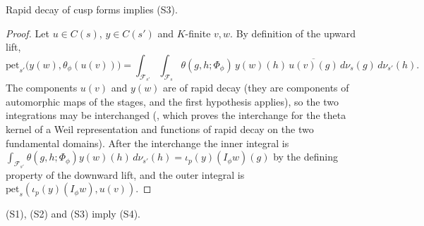 \begin{lemma}\label{pf:bundles:lem:adj}
Rapid decay of cusp forms implies (S3).
\end{lemma}

\begin{proof}
Let $u\in C(s)$, $y\in C(s')$ and $K$-finite $v,w$. By definition of the upward lift,
\[
\mathrm{pet}_{s'}\bigl(y(w),\theta_\phi(u(v))\bigr)=\int_{\mathcal F_{s'}}\int_{\mathcal F_s}\theta(g,h;\Phi_\phi)\,y(w)(h)\,
\overline{u(v)(g)}\,d\nu_s(g)\,d\nu_{s'}(h).
\]
The components $u(v)$ and $y(w)$ are of rapid decay (they are components of automorphic maps of the stages, and the first hypothesis
applies), so the two integrations may be interchanged (, which proves
the interchange for the theta kernel of a Weil representation and functions of rapid decay on the two fundamental domains). After the
interchange the inner integral is $\int_{\mathcal F_{s'}}\theta(g,h;\Phi_\phi)y(w)(h)\,d\nu_{s'}(h)=\iota_p(y)(I_\phi w)(g)$ by the defining
property of the downward lift, and the outer integral is $\mathrm{pet}_s(\iota_p(y)(I_\phi w),u(v))$.
\end{proof}

\begin{lemma}\label{pf:bundles:lem:upval}
(S1), (S2) and (S3) imply (S4).
\end{lemma}

